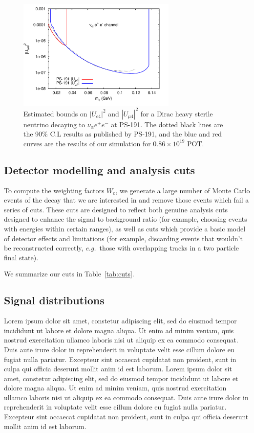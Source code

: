 \documentclass[11pt, a4paper]{article}
\newcommand{\reffig}[1]{Fig.~\ref{#1}}
\newcommand{\reftab}[1]{Table~\ref{#1}}
\def\eg{\emph{e.g.}}
\newcommand{\lorem}{ \textcolor[rgb]{0.8,0.8,0.8}{Lorem ipsum dolor sit amet, constetur
adipiscing elit, sed do eiusmod tempor incididunt ut labore et dolore magna
aliqua. Ut enim ad minim veniam, quis nostrud exercitation ullamco laboris nisi
ut aliquip ex ea commodo consequat. Duis aute irure dolor in reprehenderit in
voluptate velit esse cillum dolore eu fugiat nulla pariatur. Excepteur sint
occaecat cupidatat non proident, sunt in culpa qui officia deserunt mollit anim
id est laborum.}}
\newcommand{\newtext}[2]{\textcolor{#1}{\ul{#2}}}
\begin{document}
\begin{figure}
\center
\includegraphics[width=0.7\textwidth]{figures/PS-191_test.pdf}
\caption{\label{fig:ps191test} Estimated bounds on $|U_{e4}|^2$ and $|U_{\mu 4}|^2$ for a Dirac heavy sterile neutrino decaying to $\nu_\alpha e^+ e^-$ at PS-191. The dotted black lines are the 90\% C.L results as published by PS-191, and the blue and red curves are the results of our simulation for $0.86 \times 10^{19}$ POT.}
\end{figure}

\subsection{Detector modelling and analysis cuts}

To compute the weighting factors $W_\text{c}$, we generate a large number of
Monte Carlo events of the decay that we are interested in and remove those
events which fail a series of cuts. These cuts are designed to reflect both
genuine analysis cuts designed to enhance the signal to background ratio (for
example, choosing events with energies within certain ranges), as well as cuts
which provide a basic model of detector effects and limitations (for example,
discarding events that wouldn't be reconstructed correctly, \eg\ those with
overlapping tracks in a two particle final state).

We summarize our cuts in \reftab{tab:cuts}.
%

\subsection{Signal distributions}

\lorem\lorem 

%
\end{document}

